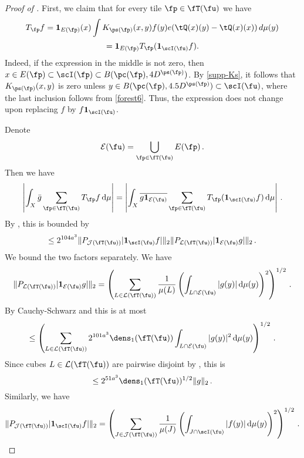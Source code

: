 \begin{proof}[Proof of ]
    First, we claim that for every tile $\fp \in \fT(\fu)$
    we have
    \[
        T_{\fp} f = \mathbf{1}_{E(\fp)}(x) \int K_{\ps(\fp)}(x,y) f(y) e(\tQ(x)(y)-\tQ(x)(x))\, d\mu(y)
    \]
    \[
        = \mathbf{1}_{E(\fp)} T_{\fp}(\mathbf{1}_{\scI(\fu)} f).
    \]
    Indeed, if the expression in the middle is not zero,
    then $x \in E(\fp) \subset \scI(\fp) \subset B(\pc(\fp), 4D^{\ps(\fp)})$.
    By \eqref{supp-Ks}, it follows that $K_{\ps(\fp)}(x,y)$ is zero
    unless $y \in B(\pc(\fp), 4.5D^{\ps(\fp)}) \subset \scI(\fu)$,
    where the last inclusion follows from \eqref{forest6}.
    Thus, the expression does not change upon replacing $f$ by $f \mathbf{1}_{\scI(\fu)}$.

    Denote
    $$
        \mathcal{E}(\fu) = \bigcup_{\fp \in \fT(\fu)} E(\fp)\,.
    $$
    Then we have
    $$
        \left| \int_X \bar g \sum_{\fp \in \fT(\fu)} T_{\fp} f \, \mathrm{d}\mu \right| = \left| \int_X \overline{ g\mathbf{1}_{\mathcal{E}(\fu)}} \sum_{\fp \in \fT(\fu)} T_{\fp} (\mathbf{1}_{\scI(\fu)}f) \, \mathrm{d}\mu \right|\,.
    $$
    By , this is bounded by
    \begin{equation}
        \label{eq-both-factors-tree}
        \le 2^{104a^3}\|P_{\mathcal{J}(\fT(\fu))}|\mathbf{1}_{\scI(\fu)}f|\|_2 \|P_{\mathcal{L}(\fT(\fu))} |\mathbf{1}_{\mathcal{E}(\fu)}g|\|_2\,.
    \end{equation}
    We bound the two factors separately.
    We have
    $$
        \|P_{\mathcal{L}(\fT(\fu))} |\mathbf{1}_{\mathcal{E}(\fu)}g|\|_2 = \left( \sum_{L \in \mathcal{L}(\fT(\fu))} \frac{1}{\mu(L)} \left(\int_{L \cap \mathcal{E}(\fu)} |g(y)| \, \mathrm{d}\mu(y)\right)^2 \right)^{1/2}\,.
    $$
    By Cauchy-Schwarz and  this is at most
    $$
        \le \left( \sum_{L \in \mathcal{L}(\fT(\fu))} 2^{101a^3} \dens_1(\fT(\fu)) \int_{L \cap \mathcal{E}(\fu)} |g(y)|^2 \, \mathrm{d}\mu(y) \right)^{1/2}\,.
    $$
    Since cubes $L \in \mathcal{L}(\fT(\fu))$ are pairwise disjoint by , this is
    \begin{equation}
        \label{eq-factor-L-tree}
         \le 2^{51 a^3} \dens_1(\fT(\fu))^{1/2} \|g\|_2\,.
    \end{equation}
    Similarly, we have
    \begin{equation}
        \label{eq-cor-tree-proof}
        \|P_{\mathcal{J}(\fT(\fu))}|\mathbf{1}_{\scI(\fu)}f|\|_2 = \left( \sum_{J \in \mathcal{J}(\fT(\fu))} \frac{1}{\mu(J)} \left(\int_{J \cap \scI(\fu)} |f(y)| \, \mathrm{d}\mu(y)\right)^2 \right)^{1/2}\,.

\end{equation}
\end{proof}
